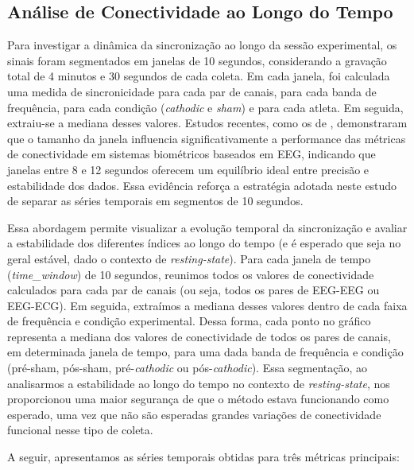 \begin{itemize}
\section{Análise de Conectividade ao Longo do Tempo}
\label{sec:connectivity_over_time}
Para investigar a dinâmica da sincronização ao longo da sessão experimental, os sinais foram segmentados em janelas de 10 segundos, considerando a gravação total de 4 minutos e 30 segundos de cada coleta. Em cada janela, foi calculada uma medida de sincronicidade para cada par de canais, para cada banda de frequência, para cada condição (\textit{cathodic} e \textit{sham}) e para cada atleta. Em seguida, extraiu-se a mediana desses valores. Estudos recentes, como os de , demonstraram que o tamanho da janela influencia significativamente a performance das métricas de conectividade em sistemas biométricos baseados em EEG, indicando que janelas entre 8 e 12 segundos oferecem um equilíbrio ideal entre precisão e estabilidade dos dados. Essa evidência reforça a estratégia adotada neste estudo de separar as séries temporais em segmentos de 10 segundos.

Essa abordagem permite visualizar a evolução temporal da sincronização e avaliar a estabilidade dos diferentes índices ao longo do tempo (e é esperado que seja no geral estável, dado o contexto de \textit{resting-state}). Para cada janela de tempo (\textit{time\_window}) de 10 segundos, reunimos todos os valores de conectividade calculados para cada par de canais (ou seja, todos os pares de EEG-EEG ou EEG-ECG). Em seguida, extraímos a mediana desses valores dentro de cada faixa de frequência e condição experimental. Dessa forma, cada ponto no gráfico representa a mediana dos valores de conectividade de todos os pares de canais, em determinada janela de tempo, para uma dada banda de frequência e condição (pré-sham, pós-sham, pré-\textit{cathodic} ou pós-\textit{cathodic}). Essa segmentação, ao analisarmos a estabilidade ao longo do tempo no contexto de \textit{resting-state}, nos proporcionou uma maior segurança de que o método estava funcionando como esperado, uma vez que não são esperadas grandes variações de conectividade funcional nesse tipo de coleta.

A seguir, apresentamos as séries temporais obtidas para três métricas principais:


\end{itemize}
